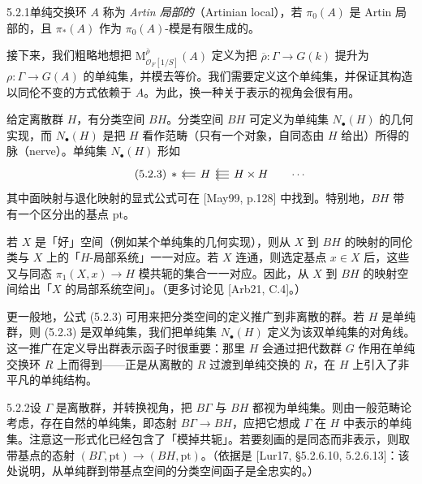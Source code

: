 \begin{defn}{5.2.1}\label{thm:a6-03-7}单纯交换环 $A$ 称为 \emph{Artin 局部的}（Artinian local），若 $\pi_0(A)$ 是 Artin 局部的，且 $\pi_*(A)$ 作为 $\pi_0(A)$-模是有限生成的。
\end{defn}

接下来，我们粗略地想把 $\mathrm M^{\overline\rho}_{\mathcal O_F[1/S]}(A)$ 定义为把 $\overline\rho\colon\Gamma\to G(k)$ 提升为 $\rho\colon\Gamma\to G(A)$ 的单纯集，并模去等价。我们需要定义这个单纯集，并保证其构造以同伦不变的方式依赖于 $A$。为此，换一种关于表示的视角会很有用。

给定离散群 $H$，有分类空间 $BH$。分类空间 $BH$ 可定义为单纯集 $N_\bullet(H)$ 的几何实现，而 $N_\bullet(H)$ 是把 $H$ 看作范畴（只有一个对象，自同态由 $H$ 给出）所得的脉（nerve）。单纯集 $N_\bullet(H)$ 形如
\begin{equation}\tag{5.2.3}\label{eq:a6-03-5}
\begin{tikzcd}[row sep=small, column sep=small]
\ast & H\arrow[l, shift left=1.5pt]\arrow[l, shift right=1.5pt] & H\times H\arrow[l, shift left=3pt]\arrow[l]\arrow[l, shift right=3pt] & \cdots
\end{tikzcd}
\end{equation}
其中面映射与退化映射的显式公式可在 [May99, p.128] 中找到。特别地，$BH$ 带有一个区分出的基点 $\mathrm{pt}$。

若 $X$ 是「好」空间（例如某个单纯集的几何实现），则从 $X$ 到 $BH$ 的映射的同伦类与 $X$ 上的「$H$-局部系统」一一对应。若 $X$ 连通，则选定基点 $x\in X$ 后，这些又与同态 $\pi_1(X,x)\to H$ 模共轭的集合一一对应。因此，从 $X$ 到 $BH$ 的映射空间给出「$X$ 的局部系统空间」。（更多讨论见 [Arb21, C.4]。）

更一般地，公式 (5.2.3) 可用来把分类空间的定义推广到非离散的群。若 $H$ 是单纯群，则 (5.2.3) 是双单纯集，我们把单纯集 $N_\bullet(H)$ 定义为该双单纯集的对角线。这一推广在定义导出群表示函子时很重要：那里 $H$ 会通过把代数群 $G$ 作用在单纯交换环 $R$ 上而得到——正是从离散的 $R$ 过渡到单纯交换的 $R$，在 $H$ 上引入了非平凡的单纯结构。

\begin{exam}{5.2.2}\label{thm:a6-03-8}设 $\Gamma$ 是离散群，并转换视角，把 $B\Gamma$ 与 $BH$ 都视为单纯集。则由一般范畴论考虑，存在自然的单纯集，即态射 $B\Gamma\to BH$，应把它想成 $\Gamma$ 在 $H$ 中表示的单纯集。注意这一形式化已经包含了「模掉共轭」。若要刻画的是同态而非表示，则取带基点的态射 $(B\Gamma,\mathrm{pt})\to(BH,\mathrm{pt})$。（依据是 [Lur17, §5.2.6.10, 5.2.6.13]：该处说明，从单纯群到带基点空间的分类空间函子是全忠实的。）
\end{exam}

